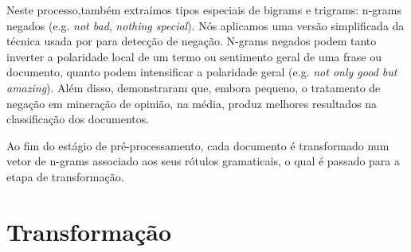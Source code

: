 \documentclass[template.tex]{subfiles}
\begin{document}
Neste processo,também extraímos tipos especiais de bigrams e trigrams: n-grams negados (e.g. \textit{not bad}, \textit{nothing special}). Nós aplicamos uma versão simplificada da técnica usada por  para detecção de negação. N-grams negados podem tanto inverter a polaridade local de um termo ou sentimento geral de uma frase ou documento, quanto podem intensificar a polaridade geral (e.g. \textit{not only good but amazing}). Além disso,  demonstraram que, embora pequeno, o tratamento de negação em mineração de opinião, na média, produz melhores resultados na classificação dos documentos. 

Ao fim do estágio de pré-processamento, cada documento é transformado num vetor de n-grams associado aos seus rótulos gramaticais, o qual é passado para a etapa de transformação.  


\section{Transformação}

\end{document}
